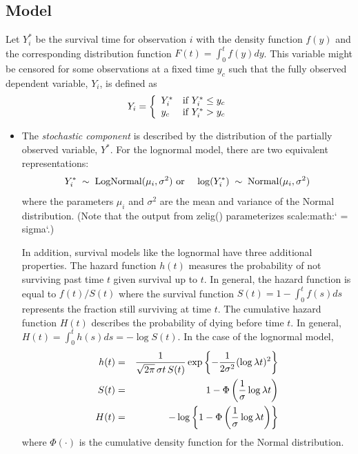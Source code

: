 \documentclass[letterpaper,10pt,english]{sphinxmanual}
\begin{document}
\subsection{Model}
\label{vignette:id15}
Let \(Y_i^*\) be the survival time for observation \(i\) with
the density function \(f(y)\) and the corresponding distribution
function \(F(t)=\int_{0}^t f(y) dy\). This variable might be
censored for some observations at a fixed time \(y_c\) such that the
fully observed dependent variable, \(Y_i\), is defined as
\begin{gather}
\begin{split}Y_i = \left\{ \begin{array}{ll}
      Y_i^* & \textrm{if }Y_i^* \leq y_c \\
      y_c & \textrm{if }Y_i^* > y_c \\
    \end{array} \right.\end{split}\notag
\end{gather}\begin{itemize}
\item {} 
The \emph{stochastic component} is described by the distribution of the
partially observed variable, \(Y^*\). For the lognormal model,
there are two equivalent representations:
\begin{gather}
\begin{split}\begin{aligned}
    Y_i^* \; \sim \; \textrm{LogNormal}(\mu_i, \sigma^2) & \textrm{ or
} & \log(Y_i^*) \; \sim \; \textrm{Normal}(\mu_i, \sigma^2)\end{aligned}\end{split}\notag
\end{gather}
where the parameters \(\mu_i\) and \(\sigma^2\) are the mean
and variance of the Normal distribution. (Note that the output from
zelig() parameterizes scale:math:{}` = sigma{}`.)

In addition, survival models like the lognormal have three additional
properties. The hazard function \(h(t)\) measures the probability
of not surviving past time \(t\) given survival up to \(t\).
In general, the hazard function is equal to \(f(t)/S(t)\) where
the survival function \(S(t) =1 - \int_{0}^t f(s) ds\) represents the fraction still surviving at
time \(t\). The cumulative hazard function \(H(t)\) describes
the probability of dying before time \(t\). In general,
\(H(t)=
\int_{0}^{t} h(s) ds = -\log S(t)\). In the case of the lognormal
model,
\begin{gather}
\begin{split}\begin{aligned}
h(t) &=& \frac{1}{\sqrt{2 \pi} \, \sigma t \, S(t)}
\exp\left\{-\frac{1}{2 \sigma^2} (\log \lambda t)^2\right\} \\
S(t) &=& 1 - \Phi\left(\frac{1}{\sigma} \log \lambda t\right) \\
H(t) &=& -\log \left\{ 1 - \Phi\left(\frac{1}{\sigma} \log \lambda t\right) \right\}\end{aligned}\end{split}\notag
\end{gather}
where \(\Phi(\cdot)\) is the cumulative density function for the
Normal distribution.


\end{itemize}
\end{document}
